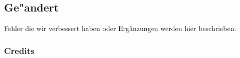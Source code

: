 %



\subsection{Ge{"a}ndert}
\label{Abschnitt:Aenderungen:Protokoll:Behobene_Probleme}

Fehler die wir verbessert haben oder Ergänzungen werden hier beschrieben.\\




\subsubsection*{Credits}









